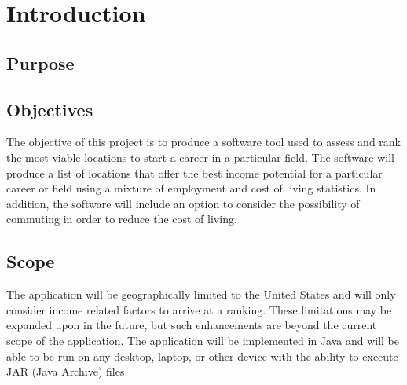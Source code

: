 \documentclass[english]{article}
\begin{document}
\vspace*{\fill} 
{
\vspace*{\fill} 

\newpage

\tableofcontents

\newpage

\setcounter{page}{1}
}


\color{black}
\section{Introduction}
\label{sec:introduction}

\subsection{Purpose}
\label{sub:purpose}


\subsection{Objectives}
The objective of this project is to produce a software tool used to assess and rank the most viable locations to start a career in a particular field. The software will produce a list of locations that offer the best income potential for a particular career or field using a mixture of employment and cost of living statistics. In addition, the software will include an option to consider the possibility of commuting in order to reduce the cost of living.

\color{black}
\subsection{Scope}
\label{sub:scope}
The application will be geographically limited to the United States and will only consider income related factors to arrive at a ranking.  These limitations may be expanded upon in the future, but such enhancements are beyond the current scope of the application. The application will be implemented in Java and will be able to be run on any desktop, laptop, or other device with the ability to execute JAR (Java Archive) files. 
\newline
\end{document}

